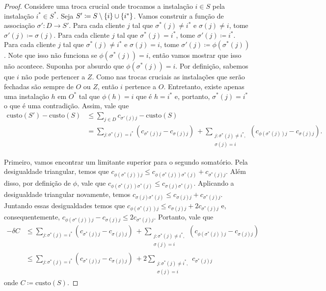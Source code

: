 \begin{proof}
Considere uma troca crucial onde trocamos a instalação $i \in S$ pela instalação $ i^* \in S^*$. Seja $S' \coloneqq S \setminus \{i\} \cup \{i^*\}$. Vamos construir a função de associação $\sigma' : D \rightarrow S'$. Para cada cliente $j$ tal que $\sigma^*(j) \neq i^*$ e $\sigma(j) \neq i$, tome $\sigma'(j) \coloneqq \sigma(j)$. Para cada cliente $j$ tal que $\sigma^*(j) = i^*$, tome $\sigma'(j)\coloneqq i^*$. Para cada cliente $j$ tal que $\sigma^*(j) \neq i^*$ e $\sigma(j)=i$, tome $\sigma'(j) \coloneqq \phi(\sigma^*(j))$. Note que isso não funciona se $\phi(\sigma^*(j)) = i$, então vamos mostrar que isso não acontece. Suponha por absurdo que $\phi(\sigma^*(j))=i$. Por definição, sabemos que $i$ não pode pertencer a $Z$. Como nas trocas cruciais as instalações que serão fechadas são sempre de $O$ ou $Z$, então $i$ pertence a $O$. Entretanto, existe apenas uma instalação $h$ em $O^*$ tal que $\phi(h) = i$ que é $h = i^*$ e, portanto, $\sigma^*(j) = i^*$ o que é uma contradição. Assim, vale que 
\begin{subequations}
    \begin{align*}
        \text{custo}(S') - \text{custo}(S) &\leq \sum_{j \in D} c_{\sigma'(j)j} - \text{custo}(S) \\
        & = \sum_{j:\sigma^*(j) = i^*} (c_{\sigma^*(j)j} - c_{\sigma(j)j}) \ + \sum_{\substack{j : \sigma^*(j)\neq i^*,\\ \sigma(j) = i}} (c_{\phi(\sigma^*(j))j} - c_{\sigma(j)j}).
    \end{align*}
\end{subequations}

Primeiro, vamos encontrar um limitante superior para o segundo somatório. Pela desigualdade triangular, temos que $c_{\phi(\sigma^*(j))j} \leq c_{\phi(\sigma^*(j))\sigma^*(j)}+c_{\sigma^*(j)j}$. Além disso, por definição de $\phi$, vale que $c_{\phi(\sigma^*(j))\sigma^*(j)}\leq c_{\sigma(j)\sigma^*(j)}$. Aplicando a desigualdade triangular novamente, temos $c_{\sigma(j)\sigma^*(j)} \leq c_{\sigma(j)j} + c_{\sigma^*(j)j}$. Juntando essas desigualdades temos que $c_{\phi(\sigma^*(j))j} \leq c_{\sigma(j)j} + 2c_{\sigma^*(j)j}$ e, consequentemente, $c_{\phi(\sigma^*(j))j} - c_{\sigma(j)j} \leq 2c_{\sigma^*(j)j}$. Portanto, vale que
\begin{subequations}
\begin{align*}
    - \delta C &\leq \sum_{j:\sigma^*(j) = i^*} (c_{\sigma^*(j)j} - c_{\sigma(j)j}) \ + \sum_{\substack{j : \sigma^*(j)\neq i^*, \\ \sigma(j) = i}} (c_{\phi(\sigma^*(j))j} - c_{\sigma(j)j}) \\
    &\leq \sum_{j:\sigma^*(j) = i^*} (c_{\sigma^*(j)j} - c_{\sigma(j)j}) \ + 2\sum_{\substack{j : \sigma^*(j)\neq i^*,\\ \sigma(j) = i}} c_{\sigma^*(j)j}
\end{align*}
\end{subequations}
onde $C\coloneqq \text{custo}(S)$.


\end{proof}
